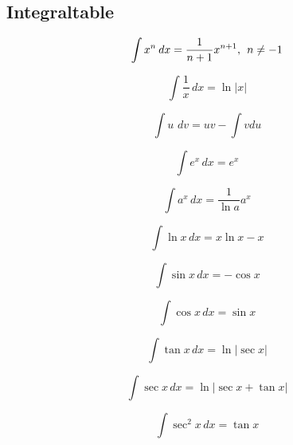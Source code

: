 \documentclass[a4paper, 10pt]{scrartcl}
\newcommand{\dx}{\hspace{2pt}dx}
\newcommand{\dd}[1]{\hspace{2pt}d#1}
\begin{document}
\subsection{Integraltable}
\begin{center}	
	\begin{multicols}{2}
		
		\begin{equation}
			\int x^n \dx = \frac{1}{n+1}x^{n+1}, \hspace{1ex} n\neq-1
		\end{equation}
		
		\begin{equation}
			\int \frac{1}{x}\dx = \ln |x|
		\end{equation}
		
		\begin{equation}
			\int u \hspace{2pt} \dd{v} = uv - \int v du
		\end{equation}
		
		
		
		\begin{equation}
			\int e^x \dx = e^x 
		\end{equation}
		
		\begin{equation}
			\int a^x \dx = \frac{1}{\ln a} a^x
		\end{equation}
		
		\begin{equation}
			\int \ln x \dx = x \ln x - x
		\end{equation}
		
		
		\begin{equation}
			\int \sin x \dx = -\cos x
		\end{equation}
		
		\begin{equation}
			\int \cos x \dx = \sin x
		\end{equation}
		
		\begin{equation}
			\int \tan x \dx = \ln |\sec x| 
		\end{equation}
		
		\begin{equation}
			\int \sec x \dx = \ln |\sec x + \tan x|
		\end{equation}
		
		\begin{equation}
			\int \sec^2 x \dx = \tan x
		\end{equation}
		

\end{multicols}
\end{center}
\end{document}
